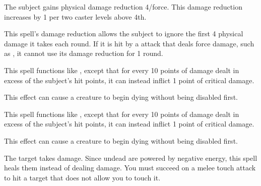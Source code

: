 \spellrng{\rngclose}
\spelldur{\durshort}
\begin{spelleffect}
  The subject gains physical damage reduction 4/force. This damage reduction increases by 1 per two caster levels above 4th.
\end{spelleffect}
\begin{spellnotes}
  This spell's damage reduction allows the subject to ignore the first 4 physical damage it takes each round. If it is hit by a attack that deals force damage, such as , it cannot use its damage reduction for 1 round.
\end{spellnotes}

\begin{spelleffect}
  This spell functions like , except that for every 10 points of damage dealt in excess of the subject's hit points, it can instead inflict 1 point of critical damage.
\end{spelleffect}
\begin{spellnotes}
  This effect can cause a creature to begin dying without being disabled first.
\end{spellnotes}

\begin{spelleffect}
  This spell functions like , except that for every 10 points of damage dealt in excess of the subject's hit points, it can instead inflict 1 point of critical damage.
\end{spelleffect}
\begin{spellnotes}
  This effect can cause a creature to begin dying without being disabled first.
\end{spellnotes}

\spellrng{\rngclose}
\begin{spelleffect}
  The target takes damage. Since undead are powered by negative energy, this spell heals them instead of dealing damage. You must succeed on a melee touch attack to hit a target that does not allow you to touch it. 
\end{spelleffect}

